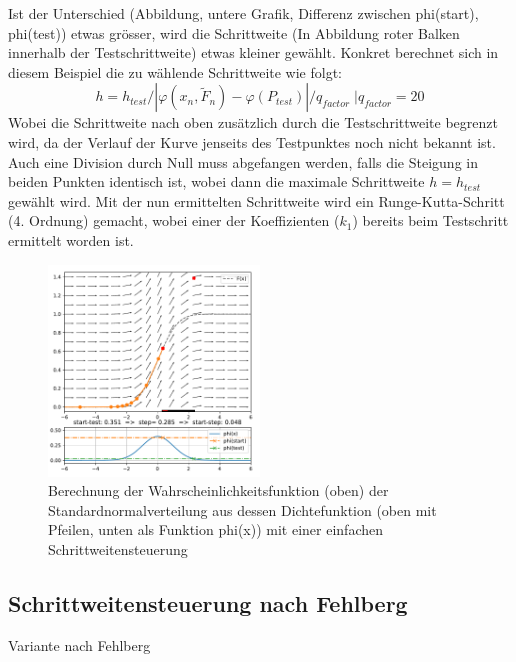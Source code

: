   Ist der Unterschied (Abbildung, untere Grafik, Differenz zwischen phi(start), phi(test)) etwas grösser,
  wird die Schrittweite (In Abbildung roter Balken innerhalb der Testschrittweite) etwas kleiner gewählt.
  Konkret berechnet sich in diesem Beispiel die zu wählende Schrittweite wie folgt:
  \[
    h=h_{test}/|\varphi(x_n, \tilde{F}_n)-\varphi(P_{test})|/q_{factor}\; |q_{factor}=20
  \]
  Wobei die Schrittweite nach oben zusätzlich durch die Testschrittweite begrenzt wird, da der Verlauf der Kurve jenseits des Testpunktes noch nicht bekannt ist.
  Auch eine Division durch Null muss abgefangen werden, falls die Steigung in beiden Punkten identisch ist,
  wobei dann die maximale Schrittweite $h=h_{test}$ gewählt wird.
  Mit der nun ermittelten Schrittweite wird ein Runge-Kutta-Schritt (4. Ordnung) gemacht,
  wobei einer der Koeffizienten ($k_1$) bereits beim Testschritt ermittelt worden ist.

  \begin{figure}
    \centering
    \includegraphics[width=0.5\textwidth]{papers/steps/img/ssc.pdf}
    \caption{Berechnung der Wahrscheinlichkeitsfunktion (oben) der Standardnormalverteilung aus dessen Dichtefunktion (oben mit Pfeilen, unten als Funktion phi(x)) mit einer einfachen Schrittweitensteuerung
      \label{buch:steps:examplessc}}
  \end{figure}

\subsection{Schrittweitensteuerung nach Fehlberg
  \label{steps:subsection:fehlberg}}
Variante nach Fehlberg

